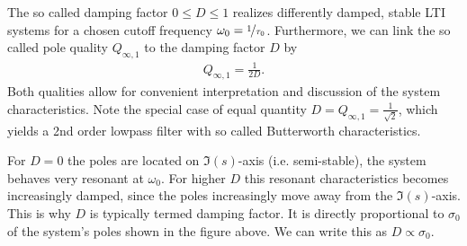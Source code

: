 \begin{mdframed}
The so called damping factor $0\leq D \leq 1$ realizes differently damped,
stable LTI systems for a chosen cutoff frequency $\omega_0=\nicefrac{1}{\tau_0}$.
Furthermore, we can link the so called pole quality $Q_{\infty,1} $ to the damping factor
$D$ by
\begin{align}
Q_{\infty,1} = \frac{1}{2 D}.
\end{align}
Both qualities allow for convenient interpretation and discussion of the
system characteristics. Note the special case of equal quantity
$D = Q_{\infty,1} = \frac{1}{\sqrt{2}}$, which yields a 2nd order
lowpass filter with so called Butterworth characteristics.
\begin{center}
%
\end{center}
%
For $D=0$ the poles are located on $\Im(s)$-axis (i.e. semi-stable),
the system behaves very resonant at $\omega_0$.
For higher $D$ this resonant characteristics becomes increasingly
damped, since the poles increasingly move away from the $\Im(s)$-axis.
%
This is why $D$ is typically termed damping factor. It is directly
proportional to $\sigma_0$ of the system's poles shown in the figure above.
We can write this as $D\propto \sigma_0$.


\end{mdframed}
